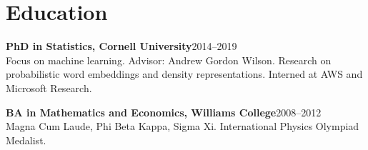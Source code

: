 \documentclass[11pt,letterpaper]{article}
\newcommand{\entrytitle}[2]{%
  \noindent\textbf{#1}\hfill #2\\
}
\begin{document}
\section{Education}

\entrytitle{PhD in Statistics, Cornell University}{2014--2019}
Focus on machine learning. Advisor: Andrew Gordon Wilson. Research on probabilistic word embeddings and density representations. Interned at AWS and Microsoft Research.

\vspace{4pt}
\entrytitle{BA in Mathematics and Economics, Williams College}{2008--2012}
Magna Cum Laude, Phi Beta Kappa, Sigma Xi. International Physics Olympiad Medalist.


\end{document}
